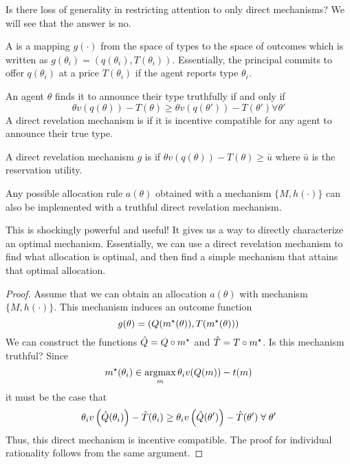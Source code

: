 \documentclass[12pt]{article}
\begin{document}
\begin{question}
	Is there loss of generality in restricting attention to only direct mechanisms? We will see that the answer is no.
\end{question}

\begin{definition}
	A  is a mapping $g(\cdot)$ from the space of types to the space of outcomes which is written as $g(\theta_i) = (q(\theta_i),T(\theta_i))$. Essentially, the principal commits to offer $q(\theta_i)$ at a price $T(\theta_i)$ if the agent reports type $\theta_i$.
\end{definition}

\begin{definition}
	An agent $\theta$ finds it  to announce their type truthfully if and only if
	\[
	\theta v(q(\theta)) - T(\theta) \ge \theta v(q(\theta')) - T(\theta') \forall \theta'
	\]
	A direct revelation mechanism is  if it is incentive compatible for any agent to announce their true type.
\end{definition}

\begin{definition}
	A direct revelation mechanism $g$ is  if $\theta v(q(\theta)) - T(\theta) \ge \bar{u}$ where $\bar{u}$ is the reservation utility.
\end{definition}


\begin{theorem}
	 Any possible allocation rule $a(\theta)$ obtained with a mechanism $\{M,h(\cdot)\}$ can also be implemented with a truthful direct revelation mechanism.
\end{theorem}

\begin{remark}
	This is shockingly powerful and useful! It gives us a way to directly characterize an optimal mechanism. Essentially, we can use a direct revelation mechanism to find what allocation is optimal, and then find a simple mechanism that attains that optimal allocation.
\end{remark}


\begin{proof}
	Assume that we can obtain an allocation $a(\theta)$ with mechanism $\{M,h(\cdot)\}$. This mechanism induces an outcome function
	\[
	g(\theta) = (Q(m^\star(\theta)),T(m^\star(\theta)))
	\]
	We can construct the functions $\hat{Q} = Q \circ m^\star$ and $\hat{T} = T \circ m^\star$. Is this mechanism truthful? Since
	\[
	m^\star(\theta_i) \in \mathop{\rm argmax}_m \theta_i v(Q(m)) - t(m)
	\]
	it must be the case that
	\[
	\theta_i v\parl \hat{Q}(\theta_i)\parr  - \hat{T}(\theta_i) \ge \theta_i v\parl \hat{Q}(\theta')\parr  - \hat{T}(\theta') \forall \theta'
	\]
	Thus, this direct mechanism is incentive compatible. The proof for individual rationality follows from the same argument.
\end{proof}
\end{document}

